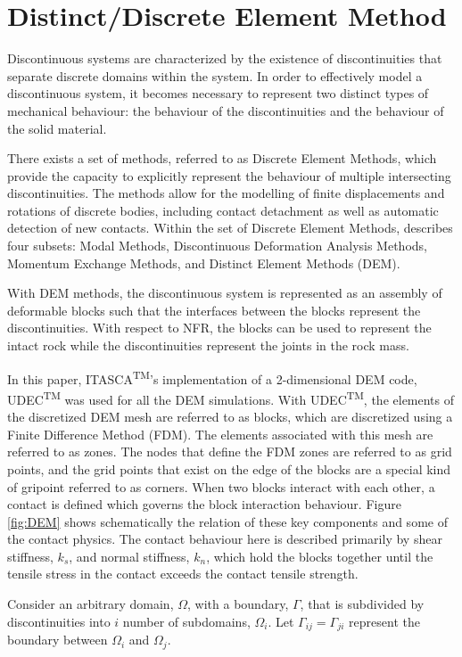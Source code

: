 \section{Distinct/Discrete Element Method}
Discontinuous systems are characterized by the existence of discontinuities that separate discrete domains within the system. In order to effectively model a discontinuous system, it becomes necessary to represent two distinct types of mechanical behaviour: the behaviour of the discontinuities and the behaviour of the solid material.

There exists a set of methods, referred to as Discrete Element Methods, which provide the capacity to explicitly represent the behaviour of multiple intersecting discontinuities. The methods allow for the modelling of finite displacements and rotations of discrete bodies, including contact detachment as well as automatic detection of new contacts. Within the set of Discrete Element Methods, \citet{CUNDALL_1992} describes four subsets: Modal Methods, Discontinuous Deformation Analysis Methods, Momentum Exchange Methods, and Distinct Element Methods (DEM).


With DEM methods, the discontinuous system is represented as an assembly of deformable blocks such that the interfaces between the blocks represent the discontinuities. With respect to NFR, the blocks can be used to represent the intact rock while the discontinuities represent the joints in the rock mass. 

In this paper, ITASCA\textsuperscript{TM}'s implementation of a 2-dimensional DEM code, UDEC\textsuperscript{TM} was used for all the DEM simulations. With UDEC\textsuperscript{TM}, the elements of the discretized DEM mesh are referred to as blocks, which are discretized using a Finite Difference Method (FDM). The elements associated with this mesh are referred to as zones. The nodes that define the FDM zones are referred to as grid points, and the grid points that exist on the edge of the blocks are a special kind of gripoint referred to as corners. When two blocks interact with each other, a contact is defined which governs the block interaction behaviour.  Figure \ref{fig:DEM} shows schematically the relation of these key components and some of the contact physics. The contact behaviour here is described primarily by shear stiffness, $k_s$, and normal stiffness, $k_n$, which hold the blocks together until the tensile stress in the contact exceeds the contact tensile strength. 

Consider an arbitrary domain, $\Omega$, with a boundary, $\Gamma$, that is subdivided by discontinuities into $i$ number of subdomains, $\Omega_i$. Let $\Gamma_{ij}=\Gamma_{ji}$ represent the boundary between $\Omega_i$ and $\Omega_j$.